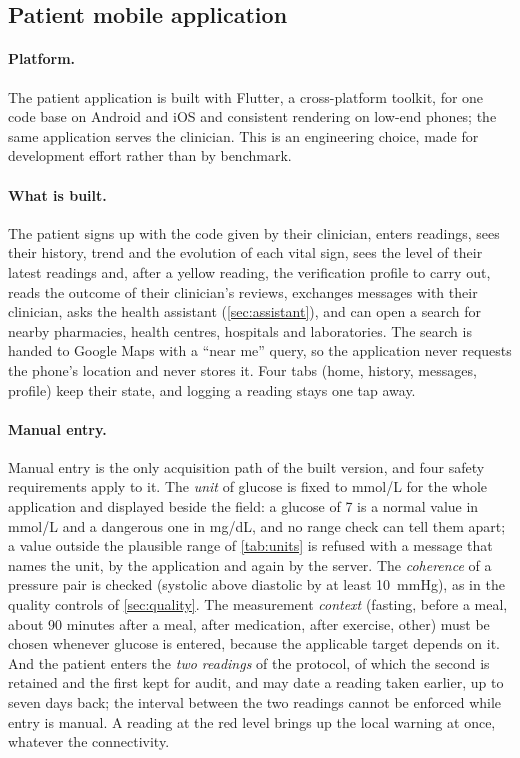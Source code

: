 \subsection{Patient mobile application}\label{sec:patient-app}\label{sec:platform}\label{sec:manual-entry}\label{sec:trends}\label{sec:bct-mapping}\label{sec:app-notifications}\label{sec:device-spec}

\paragraph{Platform.} The patient application is built with Flutter, a cross-platform toolkit, for one code base on Android and iOS and consistent rendering on low-end phones; the same application serves the clinician. This is an engineering choice, made for development effort rather than by benchmark.

\paragraph{What is built.} The patient signs up with the code given by their clinician, enters readings, sees their history, trend and the evolution of each vital sign, sees the level of their latest readings and, after a yellow reading, the verification profile to carry out, reads the outcome of their clinician's reviews, exchanges messages with their clinician, asks the health assistant (\cref{sec:assistant}), and can open a search for nearby pharmacies, health centres, hospitals and laboratories. The search is handed to Google Maps with a ``near me'' query, so the application never requests the phone's location and never stores it. Four tabs (home, history, messages, profile) keep their state, and logging a reading stays one tap away.

\paragraph{Manual entry.} Manual entry is the only acquisition path of the built version, and four safety requirements apply to it. The \emph{unit} of glucose is fixed to mmol/L for the whole application and displayed beside the field: a glucose of 7 is a normal value in mmol/L and a dangerous one in mg/dL, and no range check can tell them apart; a value outside the plausible range of \cref{tab:units} is refused with a message that names the unit, by the application and again by the server. The \emph{coherence} of a pressure pair is checked (systolic above diastolic by at least 10~mmHg), as in the quality controls of \cref{sec:quality}. The measurement \emph{context} (fasting, before a meal, about 90 minutes after a meal, after medication, after exercise, other) must be chosen whenever glucose is entered, because the applicable target depends on it. And the patient enters the \emph{two readings} of the protocol, of which the second is retained and the first kept for audit, and may date a reading taken earlier, up to seven days back; the interval between the two readings cannot be enforced while entry is manual. A reading at the red level brings up the local warning at once, whatever the connectivity.

